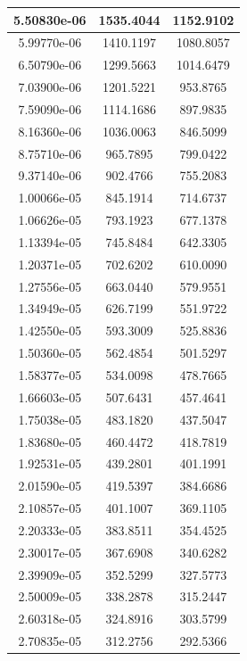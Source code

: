 \documentclass[
]{article}
\begin{document}
\begin{table}[!h]
\begin{tabular}[t]{c|c|c}
5.50830e-06 & 1535.4044 & 1152.9102\\
\hline
\rowcolor{gray!6}  5.99770e-06 & 1410.1197 & 1080.8057\\
\hline
6.50790e-06 & 1299.5663 & 1014.6479\\
\hline
\rowcolor{gray!6}  7.03900e-06 & 1201.5221 & 953.8765\\
\hline
7.59090e-06 & 1114.1686 & 897.9835\\
\hline
\rowcolor{gray!6}  8.16360e-06 & 1036.0063 & 846.5099\\
\hline
8.75710e-06 & 965.7895 & 799.0422\\
\hline
\rowcolor{gray!6}  9.37140e-06 & 902.4766 & 755.2083\\
\hline
1.00066e-05 & 845.1914 & 714.6737\\
\hline
\rowcolor{gray!6}  1.06626e-05 & 793.1923 & 677.1378\\
\hline
1.13394e-05 & 745.8484 & 642.3305\\
\hline
\rowcolor{gray!6}  1.20371e-05 & 702.6202 & 610.0090\\
\hline
1.27556e-05 & 663.0440 & 579.9551\\
\hline
\rowcolor{gray!6}  1.34949e-05 & 626.7199 & 551.9722\\
\hline
1.42550e-05 & 593.3009 & 525.8836\\
\hline
\rowcolor{gray!6}  1.50360e-05 & 562.4854 & 501.5297\\
\hline
1.58377e-05 & 534.0098 & 478.7665\\
\hline
\rowcolor{gray!6}  1.66603e-05 & 507.6431 & 457.4641\\
\hline
1.75038e-05 & 483.1820 & 437.5047\\
\hline
\rowcolor{gray!6}  1.83680e-05 & 460.4472 & 418.7819\\
\hline
1.92531e-05 & 439.2801 & 401.1991\\
\hline
\rowcolor{gray!6}  2.01590e-05 & 419.5397 & 384.6686\\
\hline
2.10857e-05 & 401.1007 & 369.1105\\
\hline
\rowcolor{gray!6}  2.20333e-05 & 383.8511 & 354.4525\\
\hline
2.30017e-05 & 367.6908 & 340.6282\\
\hline
\rowcolor{gray!6}  2.39909e-05 & 352.5299 & 327.5773\\
\hline
2.50009e-05 & 338.2878 & 315.2447\\
\hline
\rowcolor{gray!6}  2.60318e-05 & 324.8916 & 303.5799\\
\hline
2.70835e-05 & 312.2756 & 292.5366\\

\end{tabular}
\end{table}
\end{document}

